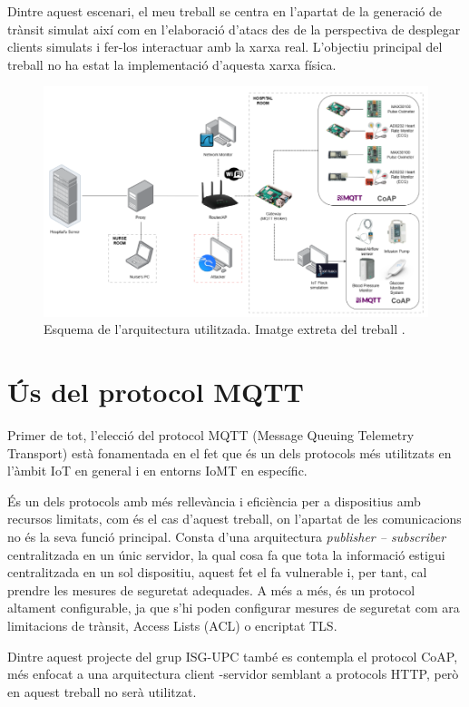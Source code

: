   Dintre aquest escenari, el meu treball se centra en l’apartat de la generació de trànsit simulat així com en l’elaboració d’atacs des de la perspectiva de desplegar clients simulats i fer-los interactuar amb la xarxa real. L’objectiu principal del treball no ha estat la implementació d’aquesta xarxa física.

  \begin{figure}[H]
    \centering
    \includegraphics[width=1\textwidth]{img/MIOTTA_UPC.png}
    \caption{Esquema de l'arquitectura utilitzada. Imatge extreta del treball \cite{miottaupcfig}.}
    \label{fig:MQTT}
  \end{figure}

\section{Ús del protocol MQTT}
  Primer de tot, l’elecció del protocol MQTT (Message Queuing Telemetry Transport) està fonamentada en el fet que és un dels protocols més utilitzats en l’àmbit IoT en general i en entorns IoMT en específic.

  És un dels protocols amb més rellevància i eficiència per a dispositius amb recursos limitats, com és el cas d’aquest treball, on l’apartat de les comunicacions no és la seva funció principal. Consta d’una arquitectura \textit{publisher – subscriber} centralitzada en un únic servidor, la qual cosa fa que tota la informació estigui centralitzada en un sol dispositiu, aquest fet el fa vulnerable i, per tant, cal prendre les mesures de seguretat adequades. A més a més, és un protocol altament configurable, ja que s’hi poden configurar mesures de seguretat com ara limitacions de trànsit, Access Lists (ACL) o encriptat TLS.

  Dintre aquest projecte del grup ISG-UPC també es contempla el protocol CoAP, més enfocat a una arquitectura client -servidor semblant a protocols HTTP, però en aquest treball no serà utilitzat.

